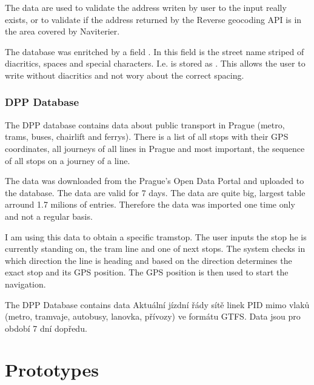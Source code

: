 	The data are used to validate the address writen by user to the input really exists, or to validate if the address returned by the Reverse geocoding API is in the area covered by Naviterier.
	
	The database was enritched by a field . In this field is the street name striped of diacritics, spaces and special characters. I.e.  is stored as . This allows the user to write without diacritics and not wory about the correct spacing.
	
	\subsubsection{DPP Database}
	The DPP database contains data about public transport in Prague (metro, trams, buses, chairlift and ferrys). 
	There is a list of all stops with their GPS coordinates, all journeys of all lines in Prague and most important, the sequence of all stops on a journey of a line.
	
	The data was downloaded from the Prague's Open Data Portal \cite{dpp-data} and uploaded to the database. The data are valid for 7 days.
	The data are quite big, largest table arround 1.7 milions of entries. Therefore the data was imported one time only and not a regular basis.
	
	I am using this data to obtain a specific tramstop. The user inputs the stop he is currently standing on, the tram line and one of next stops. The system checks in which direction the line is heading and based on the direction determines the exact stop and its GPS position. The GPS position is then used to start the navigation.
	
	The DPP Database contains data
	Aktuální jízdní řády sítě linek PID mimo vlaků (metro, tramvaje, autobusy, lanovka, přívozy) ve formátu GTFS. Data jsou pro období 7 dní dopředu.
	

	
	\section{Prototypes} \label{sec:prototypes}
	

	
	